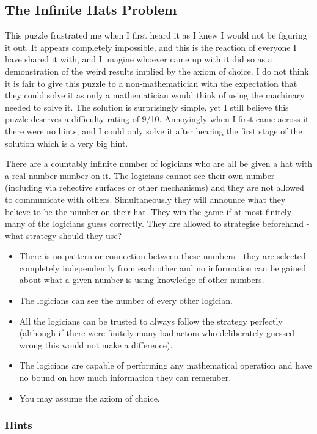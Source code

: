 \subsection{The Infinite Hats Problem}

This puzzle frustrated me when I first heard it as I knew I would not be figuring it out. It appears completely impossible, and this is the reaction of everyone I have shared it with, and I imagine whoever came up with it did so as a demonstration of the weird results implied by the axiom of choice. I do not think it is fair to give this puzzle to a non-mathematician with the expectation that they could solve it as only a mathematician would think of using the machinary needed to solve it. The solution is surprisingly simple, yet I still believe this puzzle deserves a difficulty rating of 9/10. Annoyingly when I first came across it there were no hints, and I could only solve it after hearing the first stage of the solution which is a very big hint.

There are a countably infinite number of logicians who are all be given a hat with a real number number on it. The logicians cannot see their own number (including via reflective surfaces or other mechanisms) and they are not allowed to communicate with others. Simultaneously they will announce what they believe to be the number on their hat. They win the game if at most finitely many of the logicians guess correctly. They are allowed to strategise beforehand - what strategy should they use?

\begin{itemize}
	\item There is no pattern or connection between these numbers - they are selected completely independently from each other and no information can be gained about what a given number is using knowledge of other numbers.
	\item The logicians can see the number of every other logician.
	\item All the logicians can be trusted to always follow the strategy perfectly (although if there were finitely many bad actors who deliberately guessed wrong this would not make a difference).
	\item The logicians are capable of performing any mathematical operation and have no bound on how much information they can remember.
	\item You may assume the axiom of choice.
\end{itemize}

\subsubsection{Hints}

